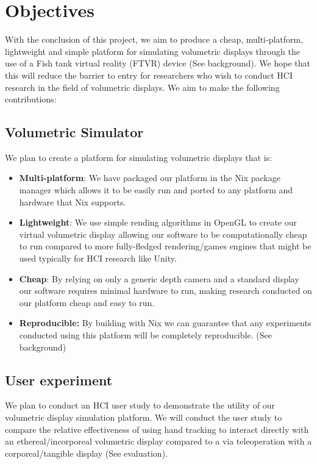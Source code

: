 \section{Objectives}

With the conclusion of this project, we aim to produce a cheap, multi-platform, lightweight and simple platform for simulating volumetric displays through the use of a Fish tank virtual reality (FTVR) device (See background). We hope that this will reduce the barrier to entry for researchers who wish to conduct HCI research in the field of volumetric displays. We aim to make the following contributions:
\subsection{Volumetric Simulator}
We plan to create a platform for simulating volumetric displays that is:
\begin{itemize}
  \item \textbf{Multi-platform}: We have packaged our platform in the Nix package manager \cite{dolstra2004nix} which allows it to be easily run and ported to any platform and hardware that Nix supports.

  \item \textbf{Lightweight}: We use simple rending algorithms in OpenGL \cite{rost2009opengl} to create our virtual volumetric display allowing our software to be computationally cheap to run compared to more fully-fledged rendering/games engines that might be used typically for HCI research like Unity.

  \item \textbf{Cheap}: By relying on only a generic depth camera and a standard display our software requires minimal hardware to run, making research conducted on our platform cheap and easy to run.

  \item \textbf{Reproducible:} By building with Nix we can guarantee that any experiments conducted using this platform will be completely reproducible. (See background)
\end{itemize}

\subsection{User experiment}
We plan to conduct an HCI user study to demonstrate the utility of our volumetric display simulation platform. We will conduct the user study to compare the relative effectiveness of using hand tracking to interact directly with an ethereal/incorporeal volumetric display compared to a via teleoperation with a corporeal/tangible display (See evaluation).
